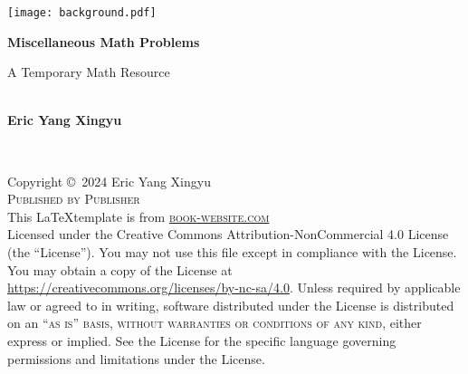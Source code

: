 \documentclass[
	12pt, %
	fleqn, %
	a4paper, %
]{LegrandOrangeBook}
\newcommand{\0}{\mathbf{0}} %
\theoremstyle{lemmastyle}
\theoremstyle{solutionStyle}
\theoremstyle{axiom_style}
\begin{document}

\titlepage %
	{\texttt{[image: background.pdf]}} %
	{ %
		\centering\sffamily %
		{\Huge\bfseries Miscellaneous Math Problems\par} %
		\vspace{16pt} %
		{\LARGE A Temporary Math Resource} %
		\vspace{24pt} %
		{\huge\bfseries \\ Eric Yang Xingyu\par} %
	}


\thispagestyle{empty} %

~\vfill %

\noindent Copyright \copyright\ 2024 Eric Yang Xingyu\\ %

\noindent \textsc{Published by Publisher}\\ %
This \LaTeX \space template is from 
\noindent \textsc{\href{https://www.latextemplates.com/template/legrand-orange-book}{book-website.com}}\\ %

\noindent Licensed under the Creative Commons Attribution-NonCommercial 4.0 License (the ``License''). You may not use this file except in compliance with the License. You may obtain a copy of the License at \url{https://creativecommons.org/licenses/by-nc-sa/4.0}. Unless required by applicable law or agreed to in writing, software distributed under the License is distributed on an \textsc{``as is'' basis, without warranties or conditions of any kind}, either express or implied. See the License for the specific language governing permissions and limitations under the License.\\ %
\end{document}

